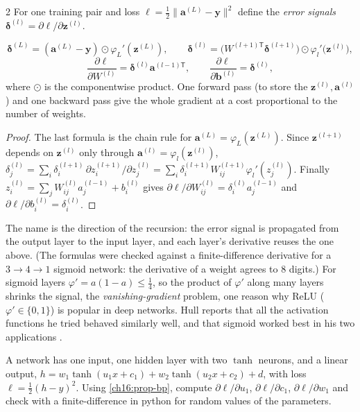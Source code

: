 \begin{paracol}{2}
For one training pair and loss $\ell=\tfrac12\|\bm a^{(L)}-\bm y\|^2$ define the \emph{error signals} $\bm\delta^{(l)}=\partial\ell/\partial\bm z^{(l)}$.
\begin{proposition}[Backpropagation]\label{ch16:prop-bp}
\[
  \bm\delta^{(L)}=(\bm a^{(L)}-\bm y)\odot\varphi_L'(\bm z^{(L)}),\qquad
  \bm\delta^{(l)}=\bigl(W^{(l+1)\mathsf T}\bm\delta^{(l+1)}\bigr)\odot\varphi_l'\bigl(\bm z^{(l)}\bigr),
\]
\[
  \frac{\partial\ell}{\partial W^{(l)}}=\bm\delta^{(l)}\bm a^{(l-1)\mathsf T},\qquad \frac{\partial\ell}{\partial\bm b^{(l)}}=\bm\delta^{(l)} ,
\]
where $\odot$ is the componentwise product. One forward pass (to store the $\bm z^{(l)},\bm a^{(l)}$) and one backward pass give the whole gradient at a cost proportional to the number of weights.
\end{proposition}
\begin{proof}
The last formula is the chain rule for $\bm a^{(L)}=\varphi_L(\bm z^{(L)})$. Since $\bm z^{(l+1)}$ depends on $\bm z^{(l)}$ only through $\bm a^{(l)}=\varphi_l(\bm z^{(l)})$,
$\delta^{(l)}_j=\sum_i\delta^{(l+1)}_i\,\partial z^{(l+1)}_i/\partial z^{(l)}_j=\sum_i\delta^{(l+1)}_iW^{(l+1)}_{ij}\varphi_l'(z^{(l)}_j)$. Finally $z^{(l)}_i=\sum_jW^{(l)}_{ij}a^{(l-1)}_j+b^{(l)}_i$ gives $\partial\ell/\partial W^{(l)}_{ij}=\delta^{(l)}_ia^{(l-1)}_j$ and $\partial\ell/\partial b_i^{(l)}=\delta^{(l)}_i$.
\end{proof}
The name is the direction of the recursion: the error signal is propagated from the output layer to the input layer, and each layer's derivative reuses the one above. (The formulas were checked against a finite-difference derivative for a $3\to4\to1$ sigmoid network: the derivative of a weight agrees to
$8$ digits.) For sigmoid layers $\varphi'=a(1-a)\le\tfrac14$, so the product of $\varphi'$ along many layers shrinks the signal, the \emph{vanishing-gradient} problem, one reason why ReLU ($\varphi'\in\{0,1\}$) is popular in deep networks. Hull reports that all the
activation functions he tried behaved similarly well, and that sigmoid worked best in his two applications .

\begin{exercise}
A network has one input, one hidden layer with two $\tanh$ neurons, and a linear output, $h=w_1\tanh(u_1x+c_1)+w_2\tanh(u_2x+c_2)+d$, with loss $\ell=\tfrac12(h-y)^2$. Using \cref{ch16:prop-bp}, compute $\partial\ell/\partial u_1$, $\partial\ell/\partial c_1$, $\partial\ell/\partial w_1$ and check with a finite-difference in
python for random values of the parameters.
\end{exercise}


\end{paracol}
